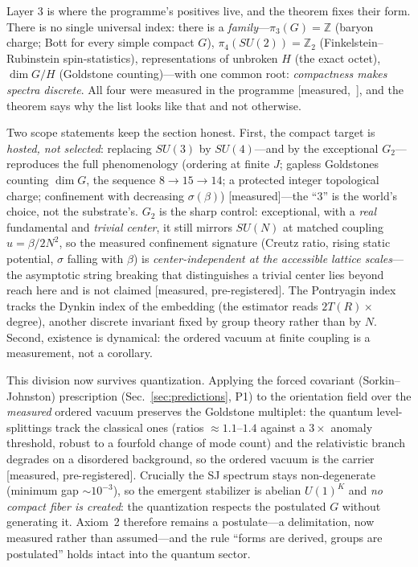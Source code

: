 \documentclass[aps,prd,reprint,nofootinbib,superscriptaddress,floatfix]{revtex4-2}
\theoremstyle{definition}
\begin{document}
Layer 3 is where the programme's positives live, and the theorem fixes their form. There
is no single universal index: there is a \emph{family}---$\pi_3(G)=\mathbb{Z}$ (baryon
charge; Bott for every simple compact $G$), $\pi_4(SU(2))=\mathbb{Z}_2$
(Finkelstein--Rubinstein spin-statistics), representations of unbroken $H$ (the exact
octet), $\dim G/H$ (Goldstone counting)---with one common root: \emph{compactness makes
spectra discrete}. All four were measured in the programme
[measured,~\cite{MatterGravityPRD,SU3PRD}], and the theorem says why the list looks like
that and not otherwise.

Two scope statements keep the section honest. First, the compact target is
\emph{hosted, not selected}: replacing $SU(3)$ by $SU(4)$---and by the exceptional
$G_2$---reproduces the full phenomenology (ordering at finite $J$; gapless Goldstones
counting $\dim G$, the sequence $8\to15\to14$; a protected integer topological charge;
confinement with decreasing $\sigma(\beta)$) [measured]---the ``3'' is the world's
choice, not the substrate's. $G_2$ is the sharp control: exceptional, with a \emph{real}
fundamental and \emph{trivial center}, it still mirrors $SU(N)$ at matched coupling
$u=\beta/2N^2$, so the measured confinement signature (Creutz ratio, rising static
potential, $\sigma$ falling with $\beta$) is \emph{center-independent at the accessible
lattice scales}---the asymptotic string breaking that distinguishes a trivial center lies
beyond reach here and is not claimed [measured, pre-registered]. The Pontryagin index
tracks the Dynkin index of the embedding (the estimator reads $2T(R)\times$ degree),
another discrete invariant fixed by group theory rather than by $N$. Second, existence is
dynamical: the ordered vacuum at finite coupling is a measurement, not a corollary.

This division now survives quantization. Applying the forced covariant (Sorkin--Johnston)
prescription (Sec.~\ref{sec:predictions}, P1) to the orientation field over the
\emph{measured} ordered vacuum preserves the Goldstone multiplet: the quantum
level-splittings track the classical ones (ratios $\approx1.1$--$1.4$ against a $3\times$
anomaly threshold, robust to a fourfold change of mode count) and the relativistic branch
degrades on a disordered background, so the ordered vacuum is the carrier [measured,
pre-registered]. Crucially the SJ spectrum stays non-degenerate (minimum gap
$\sim\!10^{-3}$), so the emergent stabilizer is abelian $U(1)^K$ and \emph{no compact fiber
is created}: the quantization respects the postulated $G$ without generating it. Axiom~2
therefore remains a postulate---a delimitation, now measured rather than assumed---and the
rule ``forms are derived, groups are postulated'' holds intact into the quantum sector.
\end{document}
